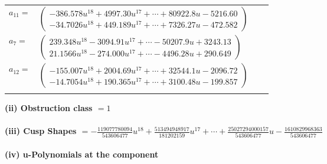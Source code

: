 \documentclass[1p]{elsarticle_modified}
\theoremstyle{definition}
\begin{document}
\begin{tabular}{m{7pt} m{180pt} m{7pt} m{180pt} }
\flushright $a_{11}=$&$\begin{pmatrix}-386.578 u^{18}+4997.30 u^{17}+\cdots+80922.8 u-5216.60\\-34.7026 u^{18}+449.189 u^{17}+\cdots+7326.27 u-472.582\end{pmatrix}$ \\
\flushright $a_{7}=$&$\begin{pmatrix}239.348 u^{18}-3094.91 u^{17}+\cdots-50207.9 u+3243.13\\21.1566 u^{18}-274.000 u^{17}+\cdots-4496.28 u+290.649\end{pmatrix}$ \\
\flushright $a_{12}=$&$\begin{pmatrix}-155.007 u^{18}+2004.69 u^{17}+\cdots+32544.1 u-2096.72\\-14.7054 u^{18}+190.365 u^{17}+\cdots+3100.48 u-199.857\end{pmatrix}$\\&\end{tabular}
\flushleft \textbf{(ii) Obstruction class $= 1$}\\~\\
\flushleft \textbf{(iii) Cusp Shapes $= -\frac{119077780094}{543606477} u^{18}+\frac{513494948917}{181202159} u^{17}+\cdots+\frac{25027294000157}{543606477} u-\frac{1610829968363}{543606477}$}\\~\\
\newpage\renewcommand{\arraystretch}{1}
\flushleft \textbf{(iv) u-Polynomials at the component}\newline \\
\end{document}
